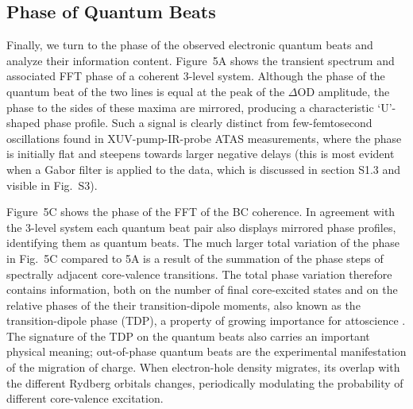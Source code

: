 \documentclass[12pt]{article}
\begin{document}

\subsection{Phase of Quantum Beats} \label{Phase}

Finally, we turn to the phase of the observed electronic quantum beats and analyze their information content. Figure~5A shows the transient spectrum and associated FFT phase of a coherent 3-level system. Although the phase of the quantum beat of the two lines is equal at the peak of the $\Delta$OD amplitude, the phase to the sides of these maxima are mirrored, producing a characteristic `U'-shaped phase profile. Such a signal is clearly distinct from few-femtosecond oscillations found in XUV-pump-IR-probe ATAS measurements, where the phase is initially flat and steepens towards larger negative delays (this is most evident when a Gabor filter is applied to the data, which is discussed in section S1.3 and visible in Fig.~S3).

Figure~5C shows the phase of the FFT of the BC coherence. In agreement with the 3-level system each quantum beat pair also 
displays mirrored phase profiles, identifying them as quantum beats. The much larger total variation of the phase in Fig.~5C compared to 5A is a result of the summation of the phase steps of spectrally adjacent core-valence transitions. The total phase variation therefore contains information, both on the number of final core-excited states and on the relative phases of the their transition-dipole moments, also known as the transition-dipole phase (TDP), a property of growing importance for attoscience \cite{Yuan2019}. The signature of the TDP on the quantum beats also carries an important physical meaning; out-of-phase quantum beats are the experimental manifestation of the migration of charge. When electron-hole density migrates, its overlap with the different Rydberg orbitals changes, periodically modulating the probability of different core-valence excitation.
\end{document}
